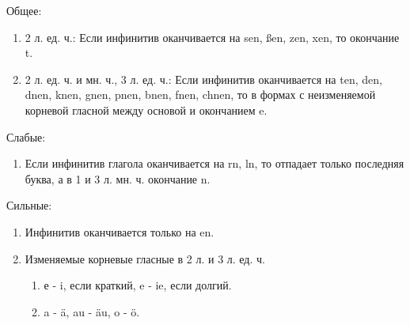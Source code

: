 \documentclass[oneside]{book}
\begin{document}
	Общее:
	\begin{enumerate}
		\item 2 л. ед. ч.: Если инфинитив оканчивается на sen, \ss en, zen, xen,
		то окончание t.

		\item 2 л. ед. ч. и мн. ч., 3 л. ед. ч.: Если инфинитив оканчивается на
		ten, den, dnen, knen, gnen, pnen, bnen, fnen, chnen, то в формах
		с неизменяемой корневой гласной между основой и окончанием e.
	\end{enumerate}

	Слабые:
	\begin{enumerate}
		\item Если инфинитив глагола оканчивается на rn, ln, то отпадает
		только последняя буква, а в 1 и 3 л. мн. ч. окончание n.
	\end{enumerate}

	Сильные:
	\begin{enumerate}
		\item Инфинитив оканчивается только на en.
		\item Изменяемые корневые гласные в 2 л. и 3 л. ед. ч.
		\begin{enumerate}
			\item е - i, если краткий, e - ie, если долгий.
			\item a - \"a, au - \"au, o - \"o.
		\end{enumerate}
	\end{enumerate}
\end{document}
